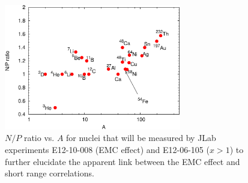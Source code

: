 \begin{figure}[tbp]
\includegraphics[width=\columnwidth,height=55mm]{plots/np_ratios_2017-crop.pdf}
\caption{$N/P$ ratio vs. $A$ for nuclei that will be measured by JLab experiments E12-10-008 (EMC effect) and E12-06-105 ($x>1$) to further elucidate the apparent link between the EMC effect and short range  correlations.}
\label{fig:np_ratios}
\end{figure}
